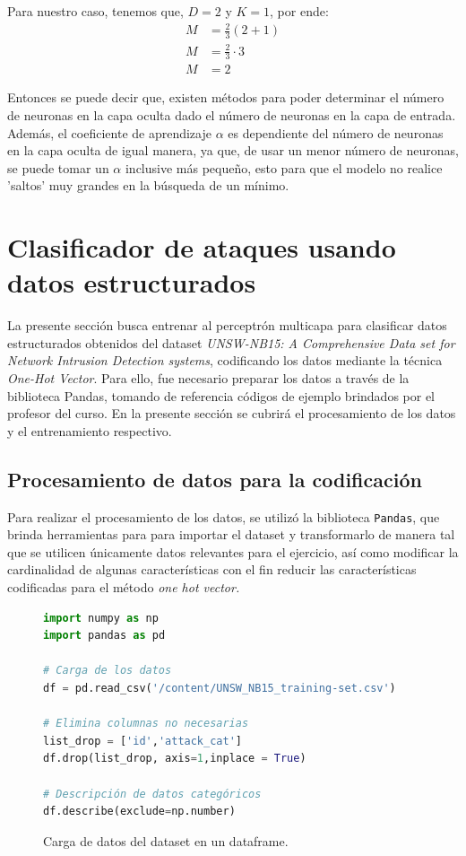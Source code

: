 \documentclass{article}
\begin{document}
Para nuestro caso, tenemos que, $D=2$ y $K=1$, por ende:
\begin{align*}
    M &= \frac{2}{3}(2+1)\\
    M &= \frac{2}{3} \cdot 3 \\
    M &= 2
\end{align*}

Entonces se puede decir que, existen métodos para poder determinar el número de neuronas en la capa oculta dado el número de neuronas en la capa de entrada. Además, el coeficiente de aprendizaje $\alpha$ es dependiente del número de neuronas en la capa oculta de igual manera, ya que, de usar un menor número de neuronas, se puede tomar un $\alpha$ inclusive más pequeño, esto para que el modelo no realice 'saltos' muy grandes en la búsqueda de un mínimo. 


\newpage

\newpage
\section{Clasificador de ataques usando datos estructurados}

La presente sección busca entrenar al perceptrón multicapa para clasificar datos estructurados obtenidos del dataset \textit{UNSW-NB15: A Comprehensive Data set for Network Intrusion Detection systems}, codificando los datos mediante la técnica \textit{One-Hot Vector}. Para ello, fue necesario preparar los datos a través de la biblioteca Pandas, tomando de referencia códigos de ejemplo brindados por el profesor del curso. En la presente sección se cubrirá el procesamiento de los datos y el entrenamiento respectivo.

\subsection{Procesamiento de datos para la codificación}

Para realizar el procesamiento de los datos, se utilizó la biblioteca \texttt{Pandas}, que brinda herramientas para para importar el dataset y transformarlo de manera tal que se utilicen únicamente datos relevantes para el ejercicio, así como modificar la cardinalidad de algunas características con el fin reducir las características codificadas para el método \textit{one hot vector.}

\begin{figure}[htbp]
\begin{lstlisting}[language=Python, texcl=True]
import numpy as np
import pandas as pd

# Carga de los datos
df = pd.read_csv('/content/UNSW_NB15_training-set.csv')

# Elimina columnas no necesarias
list_drop = ['id','attack_cat']
df.drop(list_drop, axis=1,inplace = True)

# Descripción de datos categóricos
df.describe(exclude=np.number)
\end{lstlisting}
\caption{Carga de datos del dataset en un dataframe.}
\label{code:dataframes}
\end{figure}
\end{document}
